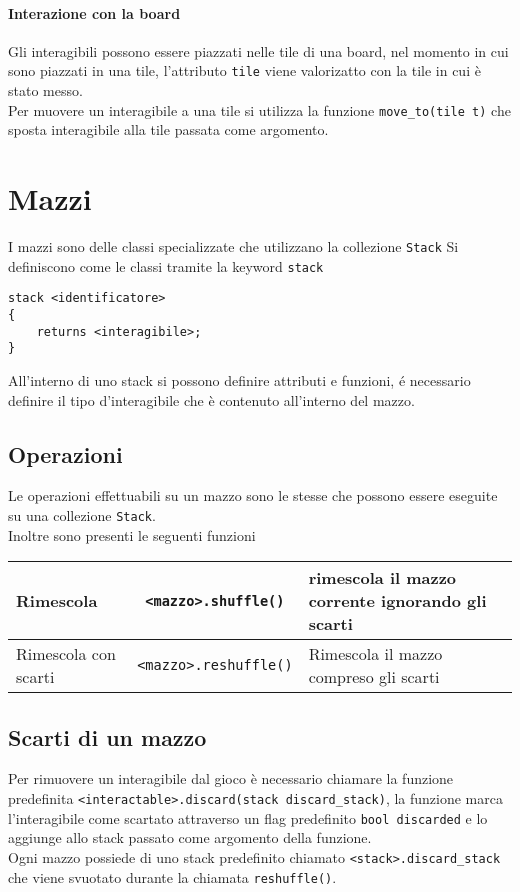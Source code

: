 \paragraph{Interazione con la board}
Gli interagibili possono essere piazzati nelle tile di una board, nel momento in cui sono piazzati
in una tile, l'attributo \lstinline|tile| viene valorizatto con la tile in cui è stato messo. \\
Per muovere un interagibile a una tile si utilizza la funzione \lstinline|move_to(tile t)| che
sposta interagibile alla tile passata come argomento. \\ 

\section{Mazzi}
I mazzi sono delle classi specializzate che utilizzano la collezione \lstinline|Stack| 
Si definiscono come le classi tramite la keyword \lstinline|stack|
\begin{lstlisting}
stack <identificatore> 
{ 
    returns <interagibile>;
}
\end{lstlisting}
All'interno di uno stack si possono definire attributi e funzioni, 
é necessario definire il tipo d'interagibile che è contenuto all'interno del mazzo.  

\subsection{Operazioni}
Le operazioni effettuabili su un mazzo sono le stesse che possono essere eseguite su una 
collezione \lstinline|Stack|. \\
Inoltre sono presenti le seguenti funzioni
\begin{center}
\begin{tabularx}{\linewidth}{|l|c|X|}
    \hline
    Rimescola & \lstinline|<mazzo>.shuffle()| & rimescola il mazzo corrente ignorando gli scarti \\
    \hline
    Rimescola con scarti & \lstinline|<mazzo>.reshuffle()| & Rimescola il mazzo compreso gli scarti \\ 
    \hline
\end{tabularx}
\end{center}

\subsection{Scarti di un mazzo}
Per rimuovere un interagibile dal gioco è necessario chiamare la funzione predefinita 
\lstinline|<interactable>.discard(stack discard_stack)|, la funzione marca l'interagibile come scartato
attraverso un flag predefinito \lstinline|bool discarded| e lo aggiunge allo stack passato 
come argomento della funzione. \\
Ogni mazzo possiede di uno stack predefinito chiamato \lstinline|<stack>.discard_stack| che 
viene svuotato durante la chiamata \lstinline|reshuffle()|.

